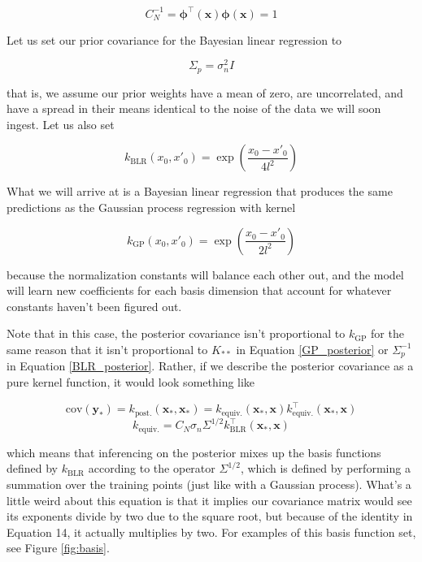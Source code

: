 \documentclass{article}
\begin{document}
\begin{equation}
    C_N^{-1} = \boldsymbol{\phi}^\top(\mathbf{x})\boldsymbol{\phi}(\mathbf{x}) = 1
\end{equation}


Let us set our prior covariance for the Bayesian linear regression to

\begin{equation}
    \Sigma_p=\sigma_n^2 I
\end{equation}

that is, we assume our prior weights have a mean of zero, are uncorrelated, and have a spread in their means identical to the noise of the data we will soon ingest. Let us also set 

\begin{equation}
    k_\text{BLR}(x_0,x'_0)=\exp\left(\frac{x_0-x'_0}{4l^2}\right)
\end{equation}

What we will arrive at is a Bayesian linear regression that produces the same predictions as the Gaussian process regression with kernel

\begin{equation}
    k_\text{GP}(x_0,x'_0)=\exp\left(\frac{x_0-x'_0}{2l^2}\right)
\end{equation}

because the normalization constants will balance each other out, and the model will learn new coefficients for each basis dimension that account for whatever constants haven't been figured out.

Note that in this case, the posterior covariance isn't proportional to $k_\text{GP}$ for the same reason that it isn't proportional to $K_{\ast\ast}$ in Equation \ref{GP_posterior} or $\Sigma_p^{-1}$ in Equation \ref{BLR_posterior}. Rather, if we describe the posterior covariance as a pure kernel function, it would look something like 

\begin{equation}
    \text{cov}(\mathbf{y_\ast})= k_\text{post.}(\mathbf{x}_\ast,\mathbf{x}_\ast) =
    k_\text{equiv.}(\mathbf{x}_\ast,\mathbf{x}) k_\text{equiv.}^\top(\mathbf{x}_\ast,\mathbf{x})
\end{equation}
\begin{equation}
    k_\text{equiv.} = C_N\sigma_n\Sigma^{1/2}k_\text{BLR}^\top(\mathbf{x}_\ast,\mathbf{x})
\end{equation}

which means that inferencing on the posterior mixes up the basis functions defined by $k_\text{BLR}$ according to the operator $\Sigma^{1/2}$, which is defined by performing a summation over the training points (just like with a Gaussian process). What's a little weird about this equation is that it implies our covariance matrix would see its exponents divide by two due to the square root, but because of the identity in Equation 14, it actually multiplies by two. For examples of this basis function set, see Figure \ref{fig:basis}.
\end{document}
